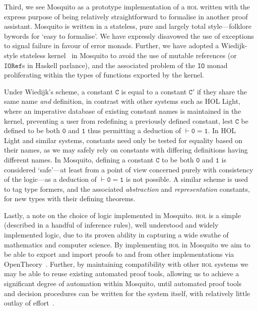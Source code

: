 \documentclass{llncs}
\newcommand{\mosquito}{Mosquito\xspace}
\begin{document}
Third, we see \mosquito as a prototype implementation of a \textsc{hol} written with the express purpose of being relatively straightforward to formalise in another proof assistant.
\mosquito is written in a stateless, pure and largely total style---folklore bywords for `easy to formalise'.
We have expressly disavowed the use of exceptions to signal failure in favour of error monads.
Further, we have adopted a Wiedijk-style stateless kernel~\cite{wiedijk:stateless:2011} in \mosquito to avoid the use of mutable references (or $\mathtt{IORef}$s in Haskell parlance), and the associated problem of the $\mathtt{IO}$ monad proliferating within the types of functions exported by the kernel.

Under Wiedijk's scheme, a constant $\mathtt{C}$ is equal to a constant $\mathtt{C'}$ if they share the same name \emph{and} definition, in contrast with other systems such as HOL Light, where an imperative database of existing constant names is maintained in the kernel, preventing a user from redefining a previously defined constant, lest $\mathtt{C}$ be defined to be both $\mathtt{0}$ and $\mathtt{1}$ thus permitting a deduction of $\vdash \mathtt{0 = 1}$.
In HOL Light and similar systems, constants need only be tested for equality based on their names, as we may safely rely on constants with differing definitions having different names.
In \mosquito, defining a constant $\mathtt{C}$ to be both $\mathtt{0}$ and $\mathtt{1}$ is considered `safe'---at least from a point of view concerned purely with consistency of the logic---as a deduction of $\vdash \mathtt{0 = 1}$ is not possible.
A similar scheme is used to tag type formers, and the associated \emph{abstraction} and \emph{representation} constants, for new types with their defining theorems.

Lastly, a note on the choice of logic implemented in \mosquito.
\textsc{hol} is a simple (described in a handful of inference rules), well understood and widely implemented logic, due to its proven ability in capturing a wide swathe of mathematics and computer science.
By implementing \textsc{hol} in \mosquito we aim to be able to export and import proofs to and from other implementations via OpenTheory~\cite{hurd:opentheory:2011}.
Further, by maintaining compatibility with other \textsc{hol} systems we may be able to reuse existing automated proof tools, allowing us to achieve a significant degree of automation within \mosquito, until automated proof tools and decision procedures can be written for the system itself, with relatively little outlay of effort~\cite{kumar:standalone:2012}.
\end{document}

